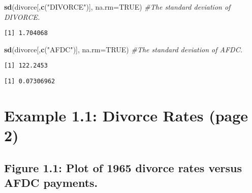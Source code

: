 \documentclass[]{book}
\newenvironment{Shaded}{\begin{snugshade}}{\end{snugshade}}
\newcommand{\CommentTok}[1]{\textcolor[rgb]{0.56,0.35,0.01}{\textit{#1}}}
\newcommand{\DataTypeTok}[1]{\textcolor[rgb]{0.13,0.29,0.53}{#1}}
\newcommand{\KeywordTok}[1]{\textcolor[rgb]{0.13,0.29,0.53}{\textbf{#1}}}
\newcommand{\NormalTok}[1]{#1}
\newcommand{\OperatorTok}[1]{\textcolor[rgb]{0.81,0.36,0.00}{\textbf{#1}}}
\newcommand{\OtherTok}[1]{\textcolor[rgb]{0.56,0.35,0.01}{#1}}
\newcommand{\StringTok}[1]{\textcolor[rgb]{0.31,0.60,0.02}{#1}}
\begin{document}
\begin{Shaded}
\begin{Highlighting}[]
\KeywordTok{sd}\NormalTok{(divorce[,}\KeywordTok{c}\NormalTok{(}\StringTok{"DIVORCE"}\NormalTok{)], }\DataTypeTok{na.rm=}\OtherTok{TRUE}\NormalTok{) }\CommentTok{#The standard deviation of DIVORCE.}
\end{Highlighting}
\end{Shaded}

\begin{verbatim}
[1] 1.704068
\end{verbatim}

\begin{Shaded}
\begin{Highlighting}[]
\KeywordTok{sd}\NormalTok{(divorce[,}\KeywordTok{c}\NormalTok{(}\StringTok{"AFDC"}\NormalTok{)], }\DataTypeTok{na.rm=}\OtherTok{TRUE}\NormalTok{) }\CommentTok{#The standard deviation of AFDC.}
\end{Highlighting}
\end{Shaded}

\begin{verbatim}
[1] 122.2453
\end{verbatim}

\begin{Shaded}
\end{Shaded}

\begin{verbatim}
[1] 0.07306962
\end{verbatim}

\hypertarget{example-1.1-divorce-rates-page-2}{%
\section{Example 1.1: Divorce Rates (page 2)}\label{example-1.1-divorce-rates-page-2}}

\hypertarget{figure-1.1-plot-of-1965-divorce-rates-versus-afdc-payments.}{%
\subsection{Figure 1.1: Plot of 1965 divorce rates versus AFDC payments.}\label{figure-1.1-plot-of-1965-divorce-rates-versus-afdc-payments.}}
\end{document}
